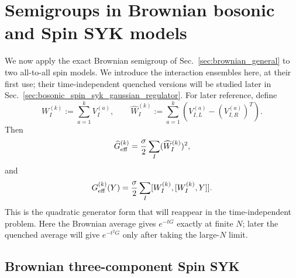 \documentclass{article}
\theoremstyle{definition}
\begin{document}
\section{Semigroups in Brownian bosonic and Spin SYK models}
\label{sec:brownian_spin_syk}

We now apply the exact Brownian semigroup of
Sec.~\ref{sec:brownian_general} to two all-to-all spin models.  We introduce
the interaction ensembles here, at their first use; their time-independent
quenched versions will be studied later in
Sec.~\ref{sec:bosonic_spin_syk_gaussian_regulator}.  For later reference,
define
\begin{equation}
    W_I^{(k)}:=\sum_{a=1}^kV_I^{(a)},
    \qquad
    \widehat W_I^{(k)}
    :=\sum_{a=1}^k
      \left(V_{I,L}^{(a)}-(V_{I,R}^{(a)})^T\right).
\end{equation}
Then
\begin{equation}
    \widehat G_{\rm eff}^{(k)}
    =\frac{\sigma}{2}\sum_I(\widehat W_I^{(k)})^2,
\end{equation}
and
\begin{equation}
    G_{\rm eff}^{(k)}(Y)
    =\frac{\sigma}{2}\sum_I
      [W_I^{(k)},[W_I^{(k)},Y]].
\end{equation}
This is the quadratic generator form that will reappear in the time-independent
problem.  Here the Brownian average gives $e^{-t G}$ exactly at finite $N$;
later the quenched average will give $e^{-t^2G}$ only after taking the
large-$N$ limit.

\subsection{Brownian three-component Spin SYK}
\end{document}
